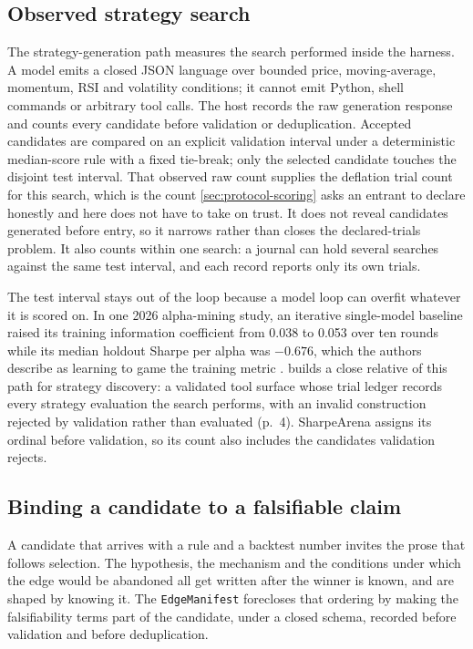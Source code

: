 \subsection{Observed strategy search}\label{sec:observed-search}

The strategy-generation path measures the search performed inside the harness. A model emits a closed JSON language over bounded price, moving-average, momentum, RSI and volatility conditions; it cannot emit Python, shell commands or arbitrary tool calls. The host records the raw generation response and counts every candidate before validation or deduplication. Accepted candidates are compared on an explicit validation interval under a deterministic median-score rule with a fixed tie-break; only the selected candidate touches the disjoint test interval. That observed raw count supplies the deflation trial count for this search, which is the count \cref{sec:protocol-scoring} asks an entrant to declare honestly and here does not have to take on trust. It does not reveal candidates generated before entry, so it narrows rather than closes the declared-trials problem. It also counts within one search: a journal can hold several searches against the same test interval, and each record reports only its own trials.

The test interval stays out of the loop because a model loop can overfit whatever it is scored on. In one 2026 alpha-mining study, an iterative single-model baseline raised its training information coefficient from 0.038 to 0.053 over ten rounds while its median holdout Sharpe per alpha was $-0.676$, which the authors describe as learning to game the training metric \citep[p.~19]{li2026agora}.  builds a close relative of this path for strategy discovery: a validated tool surface whose trial ledger records every strategy evaluation the search performs, with an invalid construction rejected by validation rather than evaluated (p.~4). SharpeArena assigns its ordinal before validation, so its count also includes the candidates validation rejects.

\subsection{Binding a candidate to a falsifiable claim}\label{sec:edge-manifest}

A candidate that arrives with a rule and a backtest number invites the prose that follows selection. The hypothesis, the mechanism and the conditions under which the edge would be abandoned all get written after the winner is known, and are shaped by knowing it. The \texttt{EdgeManifest} forecloses that ordering by making the falsifiability terms part of the candidate, under a closed schema, recorded before validation and before deduplication.

